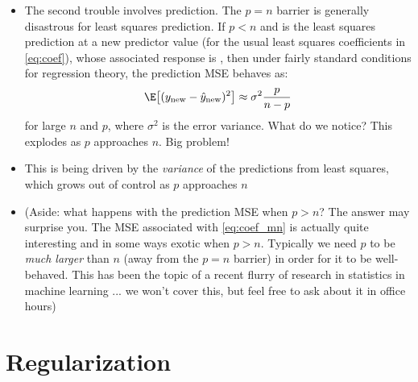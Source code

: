 \documentclass{article}
\begin{document}
\begin{itemize}
\item The second trouble involves prediction. The $p = n$ barrier is generally
  disastrous for least squares prediction. If $p < n$ and  is the least squares prediction at a new predictor
  value  (for \smash{$\hbeta$} the usual least squares
  coefficients in \eqref{eq:coef}), whose associated response is
  , then under fairly standard conditions for regression
  theory,
  the prediction MSE behaves as: 
  \[
  \E \big[ (y_{\new} - \hat{y}_{\new})^2 \big] \approx \sigma^2
  \frac{p}{n-p} 
  \]
  for large $n$ and $p$, where $\sigma^2$ is the error variance. What do we
  notice? This explodes as $p$ approaches $n$. Big problem!

\item This is being driven by the \emph{variance} of the predictions from least 
  squares, which grows out of control as $p$ approaches $n$

\item (Aside: what happens with the prediction MSE when $p > n$? The answer may
  surprise you. The MSE associated with \eqref{eq:coef_mn} is actually quite
  interesting and in some ways exotic when $p > n$. Typically we need $p$ to be
  \emph{much larger} than $n$ (away from the $p = n$ barrier) in order for it to
  be well-behaved. This has been the topic of a recent flurry of research in
  statistics in machine learning ...  we won't cover this, but feel free to ask
  about it in office hours)     
\end{itemize}

\section{Regularization}
\end{document}
